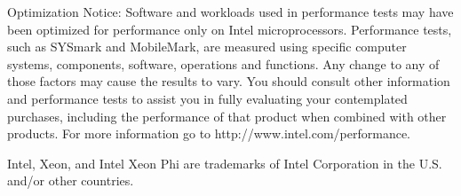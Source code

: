 \scriptsize

\noindent Optimization Notice: Software and workloads used in
performance tests may have been optimized for performance only on
Intel microprocessors.  Performance tests, such as SYSmark and
MobileMark, are measured using specific computer systems,
components, software, operations and functions.  Any change to any
of those factors may cause the results to vary.  You should
consult other information and performance tests to assist you in
fully evaluating your contemplated purchases, including the
performance of that product when combined with other products.
For more information go to http://www.intel.com/performance.

\noindent Intel, Xeon, and Intel Xeon
Phi are trademarks of Intel Corporation in the U.S. and/or other
countries.

